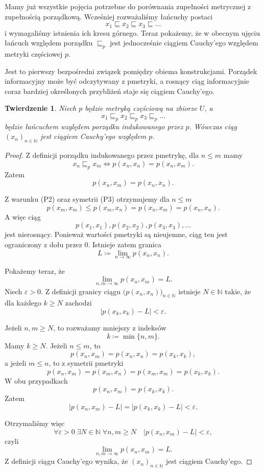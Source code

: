 \documentclass[11pt,a4paper]{article}
\theoremstyle{definition}
\theoremstyle{plain}
\newtheorem{twierdzenie}[definicja]{Twierdzenie}
\begin{document}
Mamy już wszystkie pojęcia potrzebne do porównania zupełności
metrycznej z zupełnością porządkową. Wcześniej rozważaliśmy łańcuchy
postaci
\[
x_1\sqsubseteq x_2\sqsubseteq x_3\sqsubseteq\ldots
\]
i wymagaliśmy istnienia ich kresu górnego. Teraz pokażemy, że w obecnym
ujęciu łańcuch względem porządku $\sqsubseteq_p$ jest jednocześnie
ciągiem Cauchy'ego względem metryki częściowej $p$.

Jest to pierwszy bezpośredni związek pomiędzy obiema konstrukcjami.
Porządek informacyjny może być odczytywany z pmetryki, a rosnący ciąg
informacyjnie coraz bardziej określonych przybliżeń staje się ciągiem
Cauchy'ego.

\begin{twierdzenie}\label{tw:lanuch_jest_cauchy}
	Niech $p$ będzie metryką częściową na zbiorze $U$, a
	\[
	x_1\sqsubseteq_p x_2\sqsubseteq_p x_3\sqsubseteq_p\ldots
	\]
	będzie łańcuchem względem porządku indukowanego przez $p$. Wówczas
	ciąg $(x_n)_{n\in\mathbb N}$ jest ciągiem Cauchy'ego względem $p$.
\end{twierdzenie}

\begin{proof}
	Z definicji porządku indukowanego przez pmetrykę, dla $n\leq m$ mamy
	\[
	x_n\sqsubseteq_p x_m
	\iff
	p(x_n,x_n)=p(x_n,x_m).
	\]
	Zatem
	\[
	p(x_n,x_m)=p(x_n,x_n).
	\]
	
	Z warunku (P2) oraz symetrii (P3) otrzymujemy dla $n\leq m$
	\[
	p(x_m,x_m)
	\leq
	p(x_m,x_n)
	=
	p(x_n,x_m)
	=
	p(x_n,x_n).
	\]
	A więc ciąg
	\[
	p(x_1,x_1),p(x_2,x_2),p(x_3,x_3),\ldots
	\]
	jest nierosnący. Ponieważ wartości pmetryki są nieujemne, ciąg ten
	jest ograniczony z dołu przez $0$. Istnieje zatem granica
	\[
	L\coloneqq \lim_{n\to\infty}p(x_n,x_n).
	\]
	
	Pokażemy teraz, że
	\[
	\lim_{n,m\to\infty}p(x_n,x_m)=L.
	\]
	Niech $\varepsilon>0$. Z definicji granicy ciągu
	$\bigl(p(x_n,x_n)\bigr)_{n\in\mathbb N}$ istnieje $N\in\mathbb N$
	takie, że dla każdego $k\geq N$ zachodzi
	\[
	|p(x_k,x_k)-L|<\varepsilon.
	\]
	
	Jeżeli $n,m\geq N$, to rozważamy mniejszy z indeksów
	\[
	k\coloneqq\min\{n,m\}.
	\]
	Mamy $k\geq N$. Jeżeli $n\leq m$, to
	\[
	p(x_n,x_m)=p(x_n,x_n)=p(x_k,x_k),
	\]
	a jeżeli $m\leq n$, to z symetrii pmetryki
	\[
	p(x_n,x_m)=p(x_m,x_n)=p(x_m,x_m)=p(x_k,x_k).
	\]
	W obu przypadkach
	\[
	p(x_n,x_m)=p(x_k,x_k).
	\]
	Zatem
	\[
	|p(x_n,x_m)-L|
	=
	|p(x_k,x_k)-L|
	<\varepsilon.
	\]
	
	Otrzymaliśmy więc
	\[
	\forall\varepsilon>0\;\exists N\in\mathbb N\;
	\forall n,m\geq N\quad
	|p(x_n,x_m)-L|<\varepsilon,
	\]
	czyli
	\[
	\lim_{n,m\to\infty}p(x_n,x_m)=L.
	\]
	Z definicji ciągu Cauchy'ego wynika, że
	$(x_n)_{n\in\mathbb N}$ jest ciągiem Cauchy'ego.
\end{proof}
\end{document}
